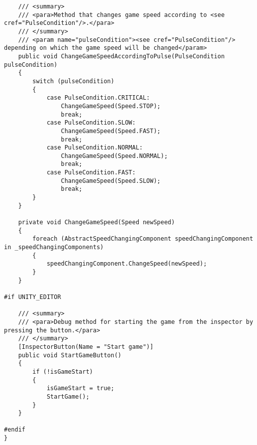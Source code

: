\begin{verbatim}
    /// <summary>
    /// <para>Method that changes game speed according to <see cref="PulseCondition"/>.</para>
    /// </summary>
    /// <param name="pulseCondition"><see cref="PulseCondition"/> depending on which the game speed will be changed</param>
    public void ChangeGameSpeedAccordingToPulse(PulseCondition pulseCondition)
    {
        switch (pulseCondition)
        {
            case PulseCondition.CRITICAL:
                ChangeGameSpeed(Speed.STOP);
                break;
            case PulseCondition.SLOW:
                ChangeGameSpeed(Speed.FAST);
                break;
            case PulseCondition.NORMAL:
                ChangeGameSpeed(Speed.NORMAL);
                break;
            case PulseCondition.FAST:
                ChangeGameSpeed(Speed.SLOW);
                break;
        }
    }

    private void ChangeGameSpeed(Speed newSpeed)
    {
        foreach (AbstractSpeedChangingComponent speedChangingComponent in _speedChangingComponents)
        {
            speedChangingComponent.ChangeSpeed(newSpeed);
        }
    }

#if UNITY_EDITOR

    /// <summary>
    /// <para>Debug method for starting the game from the inspector by pressing the button.</para>
    /// </summary>
    [InspectorButton(Name = "Start game")]
    public void StartGameButton()
    {
        if (!isGameStart)
        {
            isGameStart = true;
            StartGame();
        }
    }

#endif
}
\end{verbatim}
